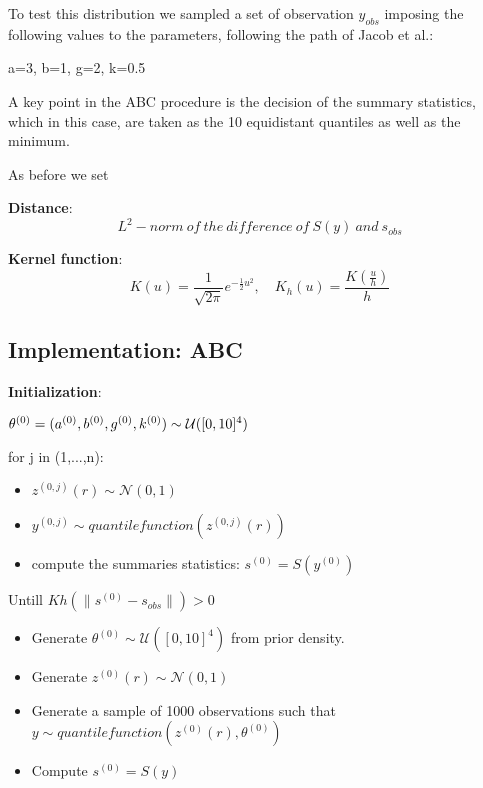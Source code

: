 \documentclass{article}
\begin{document}
	
	To test this distribution we sampled a set of observation $y_{obs}$ imposing the following values to the parameters, following the path of Jacob et al.:
	
	a=3, b=1, g=2, k=0.5
	
	A key point in the ABC procedure is the decision of the summary statistics, which in this case, are taken as the 10 equidistant quantiles as well as the minimum.
	
	As before we set 
	
	\textbf{Distance}: 
		$$L^2-norm\ of\ the\ difference\ of\ S(y)\ and\ s_{obs}$$
	
	\textbf{Kernel function}: 
	$$
	K(u) = 
	\frac{1}{\sqrt{2\pi}} e^{-\frac{1}{2}u^2}, 
	\quad K_h(u) 
	= \frac{K(\frac u h)}{h}
	$$

	\subsection{Implementation: ABC}
		
	\textbf{Initialization}:
	
	$\theta^{(0)}=(a^{(0)},b^{(0)},g^{(0)},k^{(0)}) \sim \mathcal{U}([0,10]^{4}) \\$
	
	
	
	for j in (1,...,n):
	
	\begin{itemize}
		\item $z^{(0,j)}(r) \sim \mathcal{N}(0,1)  $
		
		\item $ y^{(0,j)} \sim quantile function(z^{(0,j)}(r))$
	
	\item compute the summaries statistics:
	$ s^{(0)} =S(y^{(0)})$
\end{itemize}
	Untill $Kh(\|s^{(0)}-s_{obs}\|)>0$
	\begin{itemize}
		\item Generate $\theta^{(0)} \sim \mathcal{U}([0,10]^{4})$ from prior density.
		\item Generate $z^{(0)}(r) \sim \mathcal{N}(0,1)$
		\item Generate a sample of 1000 observations such that $y \sim quantile function(z^{(0)}(r),\theta^{(0)})$
		\item Compute $s^{(0)}=S(y)$
	\end{itemize}
	
\end{document}
